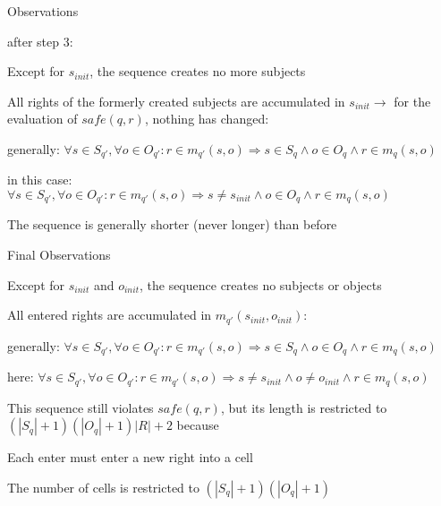 \documentclass[a4paper]{article}
\begin{document}
\begin{multicols}{3}
    Observations
    \begin{itemize*}
        \item after step 3:
              \begin{itemize*}
                  \item Except for $s_{init}$, the sequence creates no more subjects
                  \item All rights of the formerly created subjects are accumulated in $s_{init}\rightarrow$ for the evaluation of $safe(q,r)$, nothing has changed:
                        \begin{itemize*}
                            \item generally: $\forall s\in S_{q'},\forall o\in O_{q'}:r\in m_{q'}(s,o)\Rightarrow s\in S_q\wedge o\in O_q\wedge r\in m_q(s,o)$
                            \item in this case: $\forall s\in S_{q'},\forall o\in O_{q'}:r\in m_{q'}(s,o)\Rightarrow s\not=s_{init}\wedge o\in O_q\wedge r\in m_q(s,o)$
                        \end{itemize*}
                  \item The sequence is generally shorter (never longer) than before
              \end{itemize*}
        \item Final Observations
              \begin{itemize*}
                  \item Except for $s_{init}$ and $o_{init}$, the sequence creates no subjects or objects
                  \item All entered rights are accumulated in $m_{q'}(s_{init},o_{init})$:
                        \begin{itemize*}
                            \item generally: $\forall s\in S_{q'},\forall o\in O_{q'}:r\in m_{q'}(s,o)\Rightarrow s\in S_q\wedge o\in O_q\wedge r\in m_q(s,o)$
                            \item here: $\forall s\in S_{q'},\forall o\in O_{q'}:r\in m_{q'}(s,o)\Rightarrow s\not=s_{init}\wedge o\not=o_{init}\wedge r\in m_q(s,o)$
                        \end{itemize*}
                  \item This sequence still violates $safe(q,r)$, but its length is restricted to $(|S_q| + 1)(|O_q|+1)|R|+2$ because
                        \begin{itemize*}
                            \item Each enter must enter a new right into a cell
                            \item The number of cells is restricted to $(|S_q| + 1)(|O_q|+1)$
                        \end{itemize*}
              \end{itemize*}
    \end{itemize*}


\end{multicols}
\end{document}
